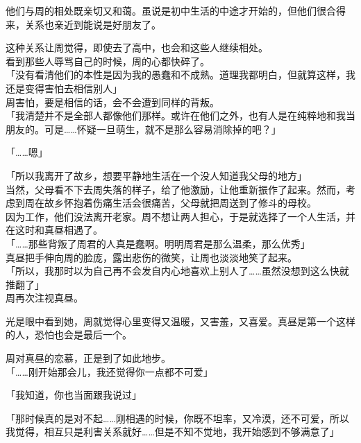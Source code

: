 他们与周的相处既亲切又和蔼。虽说是初中生活的中途才开始的，但他们很合得来，关系也亲近到能说是好朋友了。

这种关系让周觉得，即使去了高中，也会和这些人继续相处。\\

看到那些人辱骂自己的时候，周的心都快碎了。\\

「没有看清他们的本性是因为我的愚蠢和不成熟。道理我都明白，但就算这样，我还是变得害怕去相信别人」\\

周害怕，要是相信的话，会不会遭到同样的背叛。\\

「我清楚并不是全部人都像他们那样。或许在他们之外，也有人是在纯粹地和我当朋友的。可是……怀疑一旦萌生，就不是那么容易消除掉的吧？」

「……嗯」

「所以我离开了故乡，想要平静地生活在一个没人知道我父母的地方」\\

当然，父母看不下去周失落的样子，给了他激励，让他重新振作了起来。然而，考虑到周在故乡怀抱着伤痛生活会很痛苦，父母就把周送到了修斗的母校。\\

因为工作，他们没法离开老家。周不想让两人担心，于是就选择了一个人生活，并在这时和真昼相遇了。\\

「……那些背叛了周君的人真是蠢啊。明明周君是那么温柔，那么优秀」\\

真昼把手伸向周的脸庞，露出悲伤的微笑，让周也淡淡地笑了起来。\\

「所以，我那时以为自己再不会发自内心地喜欢上别人了……虽然没想到这么快就推翻了」\\

周再次注视真昼。

光是眼中看到她，周就觉得心里变得又温暖，又害羞，又喜爱。真昼是第一个这样的人，恐怕也会是最后一个。

周对真昼的恋慕，正是到了如此地步。\\

「……刚开始那会儿，我还觉得你一点都不可爱」

「我知道，你也当面跟我说过」

「那时候真的是对不起……刚相遇的时候，你既不坦率，又冷漠，还不可爱，所以我觉得，相互只是利害关系就好……但是不知不觉地，我开始感到不够满意了」\\

